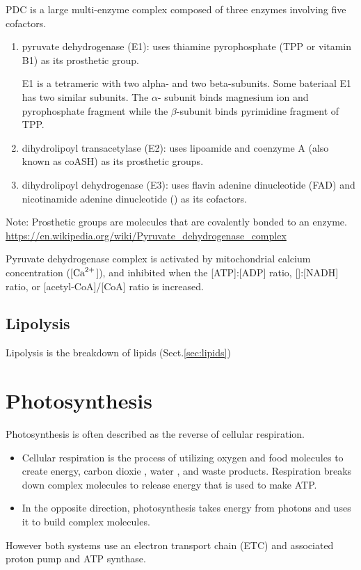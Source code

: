 PDC is a large multi-enzyme complex composed of three enzymes involving five
cofactors.
\begin{enumerate}
  \item pyruvate dehydrogenase (E1):  uses thiamine pyrophosphate (TPP or
  vitamin B1) as its prosthetic group.

E1 is a tetrameric with two alpha- and two beta-subunits. Some bateriaal E1 has
two similar subunits. The $\alpha$- subunit binds magnesium ion and
pyrophosphate fragment while the $\beta$-subunit binds pyrimidine fragment of
TPP.

  \item dihydrolipoyl transacetylase (E2): uses lipoamide and coenzyme A (also
  known as coASH) as its prosthetic groups.

  \item dihydrolipoyl dehydrogenase (E3):  uses flavin adenine dinucleotide
  (FAD) and nicotinamide adenine dinucleotide () as its cofactors.
\end{enumerate}

Note: Prosthetic groups are molecules that are covalently bonded to an enzyme.
\url{https://en.wikipedia.org/wiki/Pyruvate_dehydrogenase_complex}


Pyruvate dehydrogenase complex is activated by mitochondrial calcium
concentration ([${\text{Ca}^{2+}}$]), and inhibited when the [ATP]:[ADP] ratio,
[]:[NADH] ratio, or [acetyl-CoA]/[CoA] ratio is increased.






\subsection{Lipolysis}
\label{sec:lipolysis}

Lipolysis is the breakdown of lipids (Sect.\ref{sec:lipids})

\section{Photosynthesis}

Photosynthesis is often described as the reverse of cellular respiration.
\begin{itemize}
  \item  Cellular respiration is the process of utilizing oxygen  and
  food molecules to create energy, carbon dioxie , water , and waste
products. Respiration breaks down complex molecules to release energy that is
used to make ATP.

   \item In the opposite direction, photosynthesis takes energy from photons and
   uses it to build complex molecules.
\end{itemize}
However both systems use an electron transport chain (ETC) and associated proton
pump and ATP synthase.

